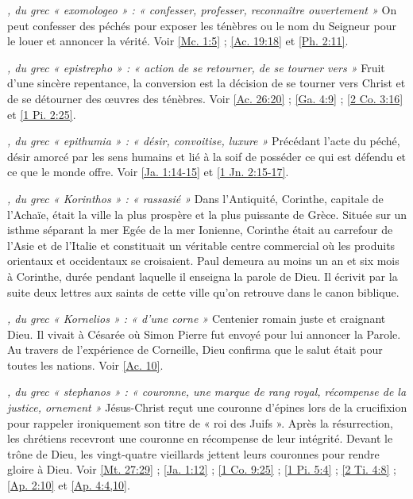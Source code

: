 \begin{multicols}{2}
\textit{, du grec « exomologeo » : « confesser, professer, reconnaître ouvertement »}\newline
On peut confesser des péchés pour exposer les ténèbres ou le nom du Seigneur pour le louer et annoncer la vérité. Voir \vref{Mc. 1:5} ; \vref{Ac. 19:18} et \vref{Ph. 2:11}.

\textit{, du grec « epistrepho » : « action de se retourner, de se tourner vers »}\newline
Fruit d'une sincère repentance, la conversion est la décision de se tourner vers Christ et de se détourner des œuvres des ténèbres. Voir \vref{Ac. 26:20} ; \vref{Ga. 4:9} ; \vref{2 Co. 3:16} et \vref{1 Pi. 2:25}.

\textit{, du grec « epithumia » : « désir, convoitise, luxure »}\newline
Précédant l'acte du péché, désir amorcé par les sens humains et lié à la soif de posséder ce qui est défendu et ce que le monde offre. Voir \vref{Ja. 1:14-15} et \vref{1 Jn. 2:15-17}.

\textit{, du grec « Korinthos » : « rassasié »}\newline
Dans l'Antiquité, Corinthe, capitale de l'Achaïe, était la ville la plus prospère et la plus puissante de Grèce. Située sur un isthme séparant la mer Egée de la mer Ionienne, Corinthe était au carrefour de l'Asie et de l'Italie et constituait un véritable centre commercial où les produits orientaux et occidentaux se croisaient. Paul demeura au moins un an et six mois à Corinthe, durée pendant laquelle il enseigna la parole de Dieu. Il écrivit par la suite deux lettres aux saints de cette ville qu'on retrouve dans le canon biblique.

\textit{, du grec « Kornelios » : « d'une corne »}\newline
Centenier romain juste et craignant Dieu. Il vivait à Césarée où Simon Pierre fut envoyé pour lui annoncer la Parole. Au travers de l'expérience de Corneille, Dieu confirma que le salut était pour toutes les nations. Voir \vref{Ac. 10}.

\textit{, du grec « stephanos » : « couronne, une marque de rang royal, récompense de la justice, ornement »}\newline
Jésus-Christ reçut une couronne d'épines lors de la crucifixion pour rappeler ironiquement son titre de « roi des Juifs ». Après la résurrection, les chrétiens recevront une couronne en récompense de leur intégrité. Devant le trône de Dieu, les vingt-quatre vieillards jettent leurs couronnes pour rendre gloire à Dieu. Voir \vref{Mt. 27:29} ; \vref{Ja. 1:12} ; \vref{1 Co. 9:25} ; \vref{1 Pi. 5:4} ; \vref{2 Ti. 4:8} ; \vref{Ap. 2:10} et \vref{Ap. 4:4,10}.


\end{multicols}

